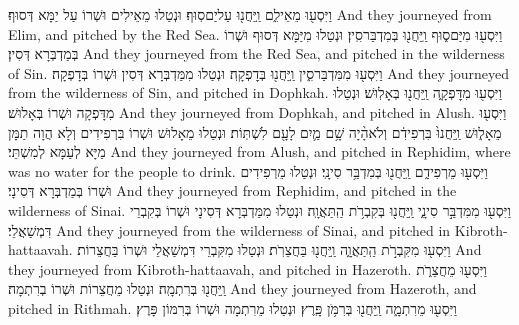{וַיִּסְע֖וּ מֵאֵילִ֑ם וַֽיַּחֲנ֖וּ עַל\maqqaf יַם\maqqaf סֽוּף׃}
{וּנְטַלוּ מֵאֵילִים וּשְׁרוֹ עַל יַמָּא דְּסוּף׃}
{And they journeyed from Elim, and pitched by the Red Sea.}{}
{וַיִּסְע֖וּ מִיַּם\maqqaf ס֑וּף וַֽיַּחֲנ֖וּ בְּמִדְבַּר\maqqaf סִֽין׃}
{וּנְטַלוּ מִיַּמָּא דְּסוּף וּשְׁרוֹ בְּמַדְבְּרָא דְּסִין׃}
{And they journeyed from the Red Sea, and pitched in the wilderness of Sin.}{}
{וַיִּסְע֖וּ מִמִּדְבַּר\maqqaf סִ֑ין וַֽיַּחֲנ֖וּ בְּדׇפְקָֽה׃}
{וּנְטַלוּ מִמַּדְבְּרָא דְּסִין וּשְׁרוֹ בְּדָפְקָה׃}
{And they journeyed from the wilderness of Sin, and pitched in Dophkah.}{}
{וַיִּסְע֖וּ מִדׇּפְקָ֑ה וַֽיַּחֲנ֖וּ בְּאָלֽוּשׁ׃}
{וּנְטַלוּ מִדָּפְקָה וּשְׁרוֹ בְּאָלוּשׁ׃}
{And they journeyed from Dophkah, and pitched in Alush.}{}
{וַיִּסְע֖וּ מֵאָל֑וּשׁ וַֽיַּחֲנוּ֙ בִּרְפִידִ֔ם וְלֹא\maqqaf הָ֨יָה שָׁ֥ם מַ֛יִם לָעָ֖ם לִשְׁתּֽוֹת׃}
{וּנְטַלוּ מֵאָלוּשׁ וּשְׁרוֹ בִּרְפִידִים וְלָא הֲוָה תַמָּן מַיָּא לְעַמָּא לְמִשְׁתֵּי׃}
{And they journeyed from Alush, and pitched in Rephidim, where was no water for the people to drink.}{}
{וַיִּסְע֖וּ מֵרְפִידִ֑ם וַֽיַּחֲנ֖וּ בְּמִדְבַּ֥ר סִינָֽי׃}
{וּנְטַלוּ מֵרְפִידִים וּשְׁרוֹ בְּמַדְבְּרָא דְּסִינָי׃}
{And they journeyed from Rephidim, and pitched in the wilderness of Sinai.}{}
{וַיִּסְע֖וּ מִמִּדְבַּ֣ר סִינָ֑י וַֽיַּחֲנ֖וּ בְּקִבְרֹ֥ת הַֽתַּאֲוָֽה׃}
{וּנְטַלוּ מִמַּדְבְּרָא דְּסִינָי וּשְׁרוֹ בְּקִבְרֵי דִּמְשַׁאֲלֵי׃}
{And they journeyed from the wilderness of Sinai, and pitched in Kibroth-hattaavah.}{}
{וַיִּסְע֖וּ מִקִּבְרֹ֣ת הַֽתַּאֲוָ֑ה וַֽיַּחֲנ֖וּ בַּחֲצֵרֹֽת׃}
{וּנְטַלוּ מִקִּבְרֵי דִּמְשַׁאֲלֵי וּשְׁרוֹ בַּחֲצֵרוֹת׃}
{And they journeyed from Kibroth-hattaavah, and pitched in Hazeroth.}{}
{וַיִּסְע֖וּ מֵחֲצֵרֹ֑ת וַֽיַּחֲנ֖וּ בְּרִתְמָֽה׃}
{וּנְטַלוּ מֵחֲצֵרוֹת וּשְׁרוֹ בְרִתְמָה׃}
{And they journeyed from Hazeroth, and pitched in Rithmah.}{}
{וַיִּסְע֖וּ מֵרִתְמָ֑ה וַֽיַּחֲנ֖וּ בְּרִמֹּ֥ן פָּֽרֶץ׃}
{וּנְטַלוּ מֵרִתְמָה וּשְׁרוֹ בְּרִמּוֹן פָּרֶץ׃}
